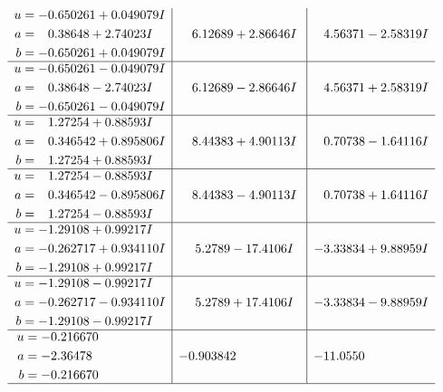 \documentclass[1p]{elsarticle_modified}
\theoremstyle{definition}
\begin{document}
$$\begin{array}{c|c|c}
\begin{aligned}
u &= -0.650261 + 0.049079 I \\
a &= \phantom{-}0.38648 + 2.74023 I \\
b &= -0.650261 + 0.049079 I\end{aligned}
 & \phantom{-}6.12689 + 2.86646 I & \phantom{-}4.56371 - 2.58319 I \\ \hline\begin{aligned}
u &= -0.650261 - 0.049079 I \\
a &= \phantom{-}0.38648 - 2.74023 I \\
b &= -0.650261 - 0.049079 I\end{aligned}
 & \phantom{-}6.12689 - 2.86646 I & \phantom{-}4.56371 + 2.58319 I \\ \hline\begin{aligned}
u &= \phantom{-}1.27254 + 0.88593 I \\
a &= \phantom{-}0.346542 + 0.895806 I \\
b &= \phantom{-}1.27254 + 0.88593 I\end{aligned}
 & \phantom{-}8.44383 + 4.90113 I & \phantom{-}0.70738 - 1.64116 I \\ \hline\begin{aligned}
u &= \phantom{-}1.27254 - 0.88593 I \\
a &= \phantom{-}0.346542 - 0.895806 I \\
b &= \phantom{-}1.27254 - 0.88593 I\end{aligned}
 & \phantom{-}8.44383 - 4.90113 I & \phantom{-}0.70738 + 1.64116 I \\ \hline\begin{aligned}
u &= -1.29108 + 0.99217 I \\
a &= -0.262717 + 0.934110 I \\
b &= -1.29108 + 0.99217 I\end{aligned}
 & \phantom{-}5.2789 - 17.4106 I & -3.33834 + 9.88959 I \\ \hline\begin{aligned}
u &= -1.29108 - 0.99217 I \\
a &= -0.262717 - 0.934110 I \\
b &= -1.29108 - 0.99217 I\end{aligned}
 & \phantom{-}5.2789 + 17.4106 I & -3.33834 - 9.88959 I \\ \hline\begin{aligned}
u &= -0.216670\phantom{ +0.000000I} \\
a &= -2.36478\phantom{ +0.000000I} \\
b &= -0.216670\phantom{ +0.000000I}\end{aligned}
 & -0.903842\phantom{ +0.000000I} & -11.0550\phantom{ +0.000000I}\\
 \hline 
 \end{array}$$\newpage\newpage\renewcommand{\arraystretch}{1}
\end{document}
